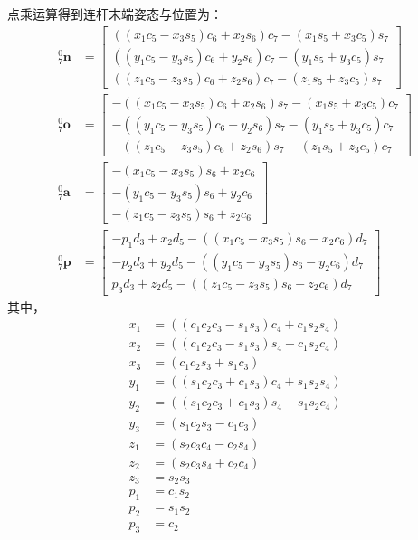 \documentclass[cn,11pt,chinese,blue,bibstyle=ieeetr]{elegantbook}
\begin{document}
点乘运算得到连杆末端姿态与位置为：
\begin{equation}\label{justin_mdh_direct_kinematics_equations}
	\begin{aligned}
		{_7^0\bm{n}} &= \begin{bmatrix}
			(({x_1}c_{5}-{x_3}s_{5})c_{6}+{x_2}s_{6})c_{7}-({x_1}s_{5}+{x_3}c_{5})s_{7} \\
			(({y_1}c_{5}-{y_3}s_{5})c_{6}+{y_2}s_{6})c_{7}-({y_1}s_{5}+{y_3}c_{5})s_{7} \\
			(({z_1}c_{5}-{z_3}s_{5})c_{6}+{z_2}s_{6})c_{7}-({z_1}s_{5}+{z_3}c_{5})s_{7}
		\end{bmatrix} \\
		{_7^0\bm{o}} &= \begin{bmatrix}
			-(({x_1}c_{5}-{x_3}s_{5})c_{6}+{x_2}s_{6})s_{7}-({x_1}s_{5}+{x_3}c_{5})c_{7} \\
			-(({y_1}c_{5}-{y_3}s_{5})c_{6}+{y_2}s_{6})s_{7}-({y_1}s_{5}+{y_3}c_{5})c_{7} \\
			-(({z_1}c_{5}-{z_3}s_{5})c_{6}+{z_2}s_{6})s_{7}-({z_1}s_{5}+{z_3}c_{5})c_{7}
		\end{bmatrix} \\
		{_7^0\bm{a}} &= \begin{bmatrix}
			-({x_1}c_{5}-{x_3}s_{5})s_{6}+{x_2}c_{6} \\
			-({y_1}c_{5}-{y_3}s_{5})s_{6}+{y_2}c_{6} \\
			-({z_1}c_{5}-{z_3}s_{5})s_{6}+{z_2}c_{6}
		\end{bmatrix} \\
		{_7^0\bm{p}} &= \begin{bmatrix}
			-{p_1}{d_3}+{x_2}{d_5}-(({x_1}c_{5}-{x_3}s_{5})s_{6}-{x_2}c_{6}){d_7} \\
			-{p_2}{d_3}+{y_2}{d_5}-(({y_1}c_{5}-{y_3}s_{5})s_{6}-{y_2}c_{6}){d_7} \\
			{p_3}{d_3}+{z_2}{d_5}-(({z_1}c_{5}-{z_3}s_{5})s_{6}-{z_2}c_{6}){d_7}
		\end{bmatrix}
	\end{aligned}
\end{equation}
其中，
\begin{equation}
\begin{aligned}
{x_1} &= ((c_{1}c_{2}c_{3}-s_{1}s_{3})c_{4}+c_{1}s_{2}s_{4}) \\
{x_2} &= ((c_{1}c_{2}c_{3}-s_{1}s_{3})s_{4}-c_{1}s_{2}c_{4}) \\
{x_3} &= (c_{1}c_{2}s_{3}+s_{1}c_{3}) \\
{y_1} &= ((s_{1}c_{2}c_{3}+c_{1}s_{3})c_{4}+s_{1}s_{2}s_{4}) \\
{y_2} &= ((s_{1}c_{2}c_{3}+c_{1}s_{3})s_{4}-s_{1}s_{2}c_{4}) \\
{y_3} &= (s_{1}c_{2}s_{3}-c_{1}c_{3}) \\
{z_1} &= (s_{2}c_{3}c_{4}-c_{2}s_{4}) \\
{z_2} &= (s_{2}c_{3}s_{4}+c_{2}c_{4}) \\
{z_3} &= s_{2}s_{3} \\
{p_1} &= c_{1}s_{2} \\
{p_2} &= s_{1}s_{2} \\
{p_3} &= c_{2}
\end{aligned}
\end{equation}
\end{document}
